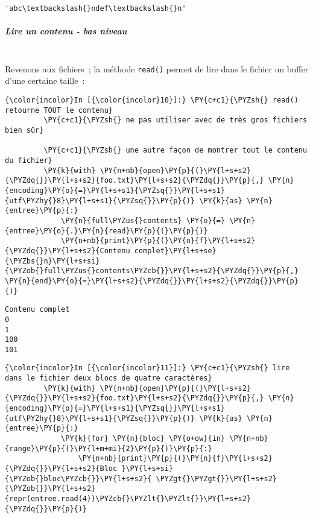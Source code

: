     \begin{Verbatim}[commandchars=\\\{\}]
'abc\textbackslash{}ndef\textbackslash{}n'

    \end{Verbatim}

    \hypertarget{lire-un-contenu---bas-niveau}{%
\subparagraph{Lire un contenu - bas
niveau\\\\}\label{lire-un-contenu---bas-niveau}}

    Revenons aux fichiers~; la méthode \texttt{read()} permet de lire dans
le fichier un buffer d'une certaine taille~:

    \begin{Verbatim}[commandchars=\\\{\}]
{\color{incolor}In [{\color{incolor}10}]:} \PY{c+c1}{\PYZsh{} read() retourne TOUT le contenu}
         \PY{c+c1}{\PYZsh{} ne pas utiliser avec de très gros fichiers bien sûr}
         
         \PY{c+c1}{\PYZsh{} une autre façon de montrer tout le contenu du fichier}
         \PY{k}{with} \PY{n+nb}{open}\PY{p}{(}\PY{l+s+s2}{\PYZdq{}}\PY{l+s+s2}{foo.txt}\PY{l+s+s2}{\PYZdq{}}\PY{p}{,} \PY{n}{encoding}\PY{o}{=}\PY{l+s+s1}{\PYZsq{}}\PY{l+s+s1}{utf\PYZhy{}8}\PY{l+s+s1}{\PYZsq{}}\PY{p}{)} \PY{k}{as} \PY{n}{entree}\PY{p}{:}
             \PY{n}{full\PYZus{}contents} \PY{o}{=} \PY{n}{entree}\PY{o}{.}\PY{n}{read}\PY{p}{(}\PY{p}{)}
             \PY{n+nb}{print}\PY{p}{(}\PY{n}{f}\PY{l+s+s2}{\PYZdq{}}\PY{l+s+s2}{Contenu complet}\PY{l+s+se}{\PYZbs{}n}\PY{l+s+si}{\PYZob{}full\PYZus{}contents\PYZcb{}}\PY{l+s+s2}{\PYZdq{}}\PY{p}{,} \PY{n}{end}\PY{o}{=}\PY{l+s+s2}{\PYZdq{}}\PY{l+s+s2}{\PYZdq{}}\PY{p}{)}
\end{Verbatim}


    \begin{Verbatim}[commandchars=\\\{\}]
Contenu complet
0
1
100
101

    \end{Verbatim}

    \begin{Verbatim}[commandchars=\\\{\}]
{\color{incolor}In [{\color{incolor}11}]:} \PY{c+c1}{\PYZsh{} lire dans le fichier deux blocs de quatre caractères}
         \PY{k}{with} \PY{n+nb}{open}\PY{p}{(}\PY{l+s+s2}{\PYZdq{}}\PY{l+s+s2}{foo.txt}\PY{l+s+s2}{\PYZdq{}}\PY{p}{,} \PY{n}{encoding}\PY{o}{=}\PY{l+s+s1}{\PYZsq{}}\PY{l+s+s1}{utf\PYZhy{}8}\PY{l+s+s1}{\PYZsq{}}\PY{p}{)} \PY{k}{as} \PY{n}{entree}\PY{p}{:}
             \PY{k}{for} \PY{n}{bloc} \PY{o+ow}{in} \PY{n+nb}{range}\PY{p}{(}\PY{l+m+mi}{2}\PY{p}{)}\PY{p}{:}
                 \PY{n+nb}{print}\PY{p}{(}\PY{n}{f}\PY{l+s+s2}{\PYZdq{}}\PY{l+s+s2}{Bloc }\PY{l+s+si}{\PYZob{}bloc\PYZcb{}}\PY{l+s+s2}{ \PYZgt{}\PYZgt{}}\PY{l+s+s2}{\PYZob{}}\PY{l+s+s2}{repr(entree.read(4))\PYZcb{}\PYZlt{}\PYZlt{}}\PY{l+s+s2}{\PYZdq{}}\PY{p}{)}
\end{Verbatim}


